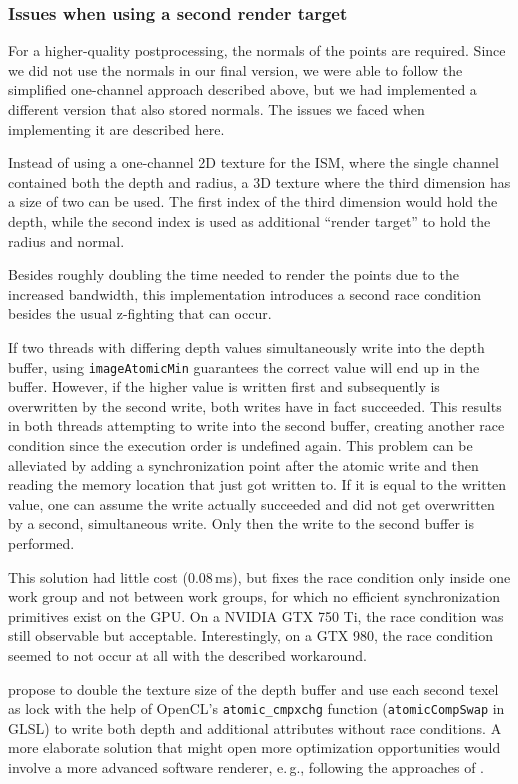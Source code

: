 \subsubsection{Issues when using a second render target}
\label{sec:impl:raceCondition}

For a higher-quality postprocessing, the normals of the points are required. Since we did not use the normals in our final version, we were able to follow the simplified one-channel approach described above, but we had implemented a different version that also stored normals. The issues we faced when implementing it are described here.

Instead of using a one-channel 2D texture for the ISM, where the single channel contained both the depth and radius, a 3D texture where the third dimension has a size of two can be used. The first index of the third dimension would hold the depth, while the second index is used as additional ``render target'' to hold the radius and normal.

Besides roughly doubling the time needed to render the points due to the increased bandwidth, this implementation introduces a second race condition besides the usual z-fighting that can occur.

If two threads with differing depth values simultaneously write into the depth buffer, using \texttt{imageAtomicMin} guarantees the correct value will end up in the buffer. However, if the higher value is written first and subsequently is overwritten by the second write, both writes have in fact succeeded. This results in both threads attempting to write into the second buffer, creating another race condition since the execution order is undefined again. This problem can be alleviated by adding a synchronization point after the atomic write and then reading the memory location that just got written to. If it is equal to the written value, one can assume the write actually succeeded and did not get overwritten by a second, simultaneous write. Only then the write to the second buffer is performed.

This solution had little cost (0.08\,ms), but fixes the race condition only inside one work group and not between work groups, for which no efficient synchronization primitives exist on the GPU. On a NVIDIA GTX 750 Ti, the race condition was still observable but acceptable. Interestingly, on a GTX 980, the race condition seemed to not occur at all with the described workaround.

\citet{Günther:2013:AcceleratedPointCloudRendering} propose to double the texture size of the depth buffer and use each second texel as lock with the help of OpenCL's \texttt{atomic\_cmpxchg} function (\texttt{atomicCompSwap} in GLSL) to write both depth and additional attributes without race conditions. A more elaborate solution that might open  more optimization opportunities would involve a more advanced software renderer, e.\,g., following the approaches of \citet{Laine:2011:SoftwareRasterization}.


